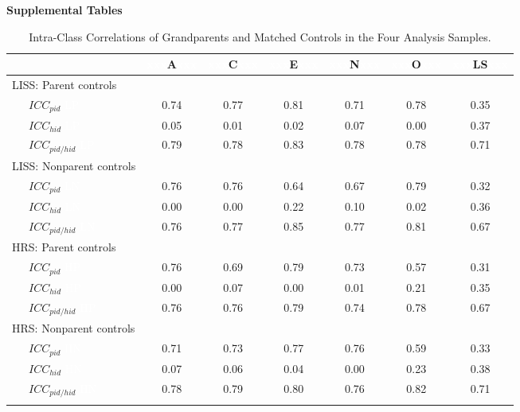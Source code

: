 \documentclass[
  english,
  man, noextraspace]{apa7}
\begin{document}
\begin{appendix}
\newpage

\noindent \textbf{Supplemental Tables}

\begin{table}[h]

\begin{center}
\begin{threeparttable}

\caption{\label{tab:icc-table}Intra-Class Correlations of Grandparents and Matched Controls in the Four Analysis Samples.}

\begin{tabular}{lcccccc}
\toprule
& \multicolumn{1}{c}{\textcolor{white}{xxx}A\textcolor{white}{xxx}} & \multicolumn{1}{c}{\textcolor{white}{xxx}C\textcolor{white}{xxx}} & \multicolumn{1}{c}{\textcolor{white}{xxx}E\textcolor{white}{xxx}} & \multicolumn{1}{c}{\textcolor{white}{xxx}N\textcolor{white}{xxx}} & \multicolumn{1}{c}{\textcolor{white}{xxx}O\textcolor{white}{xxx}} & \multicolumn{1}{c}{\textcolor{white}{xxx}LS\textcolor{white}{xxx}}\\
\midrule
LISS: Parent controls &  &  &  &  &  & \\
\ \ \ $ICC_{pid}$ \textcolor{white}{LP} & 0.74 & 0.77 & 0.81 & 0.71 & 0.78 & 0.35\\
\ \ \ $ICC_{hid}$ \textcolor{white}{LP} & 0.05 & 0.01 & 0.02 & 0.07 & 0.00 & 0.37\\
\ \ \ $ICC_{pid/hid}$ \textcolor{white}{LP} & 0.79 & 0.78 & 0.83 & 0.78 & 0.78 & 0.71\\
LISS: Nonparent controls &  &  &  &  &  & \\
\ \ \ $ICC_{pid}$ \textcolor{white}{LN} & 0.76 & 0.76 & 0.64 & 0.67 & 0.79 & 0.32\\
\ \ \ $ICC_{hid}$ \textcolor{white}{LN} & 0.00 & 0.00 & 0.22 & 0.10 & 0.02 & 0.36\\
\ \ \ $ICC_{pid/hid}$ \textcolor{white}{LN} & 0.76 & 0.77 & 0.85 & 0.77 & 0.81 & 0.67\\
HRS: Parent controls &  &  &  &  &  & \\
\ \ \ $ICC_{pid}$ \textcolor{white}{HP} & 0.76 & 0.69 & 0.79 & 0.73 & 0.57 & 0.31\\
\ \ \ $ICC_{hid}$ \textcolor{white}{HP} & 0.00 & 0.07 & 0.00 & 0.01 & 0.21 & 0.35\\
\ \ \ $ICC_{pid/hid}$ \textcolor{white}{HP} & 0.76 & 0.76 & 0.79 & 0.74 & 0.78 & 0.67\\
HRS: Nonparent controls &  &  &  &  &  & \\
\ \ \ $ICC_{pid}$ \textcolor{white}{HN} & 0.71 & 0.73 & 0.77 & 0.76 & 0.59 & 0.33\\
\ \ \ $ICC_{hid}$ \textcolor{white}{HN} & 0.07 & 0.06 & 0.04 & 0.00 & 0.23 & 0.38\\
\ \ \ $ICC_{pid/hid}$ \textcolor{white}{HN} & 0.78 & 0.79 & 0.80 & 0.76 & 0.82 & 0.71\\
\bottomrule
\addlinespace
\end{tabular}


\end{threeparttable}
\end{center}
\end{table}
\end{appendix}
\end{document}
